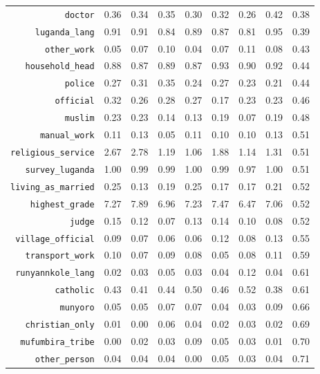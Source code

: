 \begin{longtable}{rrrrrrrrr}
  {\texttt{doctor}} & 0.36 & 0.34 & 0.35 & 0.30 & 0.32 & 0.26 & 0.42 & 0.38 \\ 
  {\texttt{luganda\_lang}} & 0.91 & 0.91 & 0.84 & 0.89 & 0.87 & 0.81 & 0.95 & 0.39 \\ 
  {\texttt{other\_work}} & 0.05 & 0.07 & 0.10 & 0.04 & 0.07 & 0.11 & 0.08 & 0.43 \\ 
  {\texttt{household\_head}} & 0.88 & 0.87 & 0.89 & 0.87 & 0.93 & 0.90 & 0.92 & 0.44 \\ 
  {\texttt{police}} & 0.27 & 0.31 & 0.35 & 0.24 & 0.27 & 0.23 & 0.21 & 0.44 \\ 
  {\texttt{official}} & 0.32 & 0.26 & 0.28 & 0.27 & 0.17 & 0.23 & 0.23 & 0.46 \\ 
  {\texttt{muslim}} & 0.23 & 0.23 & 0.14 & 0.13 & 0.19 & 0.07 & 0.19 & 0.48 \\ 
  {\texttt{manual\_work}} & 0.11 & 0.13 & 0.05 & 0.11 & 0.10 & 0.10 & 0.13 & 0.51 \\ 
  {\texttt{religious\_service}} & 2.67 & 2.78 & 1.19 & 1.06 & 1.88 & 1.14 & 1.31 & 0.51 \\ 
  {\texttt{survey\_luganda}} & 1.00 & 0.99 & 0.99 & 1.00 & 0.99 & 0.97 & 1.00 & 0.51 \\ 
  {\texttt{living\_as\_married}} & 0.25 & 0.13 & 0.19 & 0.25 & 0.17 & 0.17 & 0.21 & 0.52 \\ 
  {\texttt{highest\_grade}} & 7.27 & 7.89 & 6.96 & 7.23 & 7.47 & 6.47 & 7.06 & 0.52 \\ 
  {\texttt{judge}} & 0.15 & 0.12 & 0.07 & 0.13 & 0.14 & 0.10 & 0.08 & 0.52 \\ 
  {\texttt{village\_official}} & 0.09 & 0.07 & 0.06 & 0.06 & 0.12 & 0.08 & 0.13 & 0.55 \\ 
  {\texttt{transport\_work}} & 0.10 & 0.07 & 0.09 & 0.08 & 0.05 & 0.08 & 0.11 & 0.59 \\ 
  {\texttt{runyannkole\_lang}} & 0.02 & 0.03 & 0.05 & 0.03 & 0.04 & 0.12 & 0.04 & 0.61 \\ 
  {\texttt{catholic}} & 0.43 & 0.41 & 0.44 & 0.50 & 0.46 & 0.52 & 0.38 & 0.61 \\ 
  {\texttt{munyoro}} & 0.05 & 0.05 & 0.07 & 0.07 & 0.04 & 0.03 & 0.09 & 0.66 \\ 
  {\texttt{christian\_only}} & 0.01 & 0.00 & 0.06 & 0.04 & 0.02 & 0.03 & 0.02 & 0.69 \\ 
  {\texttt{mufumbira\_tribe}} & 0.00 & 0.02 & 0.03 & 0.09 & 0.05 & 0.03 & 0.01 & 0.70 \\ 
  {\texttt{other\_person}} & 0.04 & 0.04 & 0.04 & 0.00 & 0.05 & 0.03 & 0.04 & 0.71 \\ 

\end{longtable}
